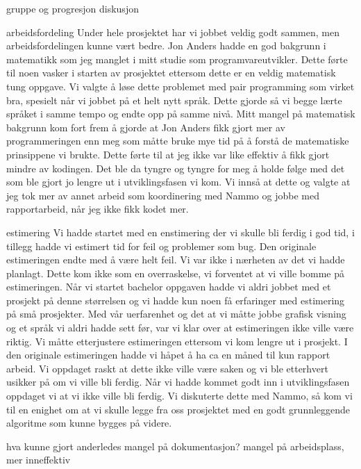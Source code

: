 gruppe og progresjon diskusjon
	
arbeidsfordeling
Under hele prosjektet har vi jobbet veldig godt sammen, men arbeidsfordelingen kunne vært bedre. Jon Anders hadde en god bakgrunn i matematikk som jeg manglet i mitt studie som programvareutvikler. Dette førte til noen vasker i starten av prosjektet ettersom dette er en veldig matematisk tung oppgave. Vi valgte å løse dette problemet med pair programming som virket bra, spesielt når vi jobbet på et helt nytt språk. Dette gjorde så vi begge lærte språket i samme tempo og endte opp på samme nivå. Mitt mangel på matematisk bakgrunn kom fort frem å gjorde at Jon Anders fikk gjort mer av programmeringen enn meg som måtte bruke mye tid på å forstå de matematiske prinsippene vi brukte. Dette førte til at jeg ikke var like effektiv å fikk gjort mindre av kodingen. Det ble da tyngre og tyngre for meg å holde følge med det som ble gjort jo lengre ut i utviklingsfasen vi kom. Vi innså at dette og valgte at jeg tok mer av annet arbeid som koordinering med Nammo og jobbe med rapportarbeid, når jeg ikke fikk kodet mer.



	estimering
Vi hadde startet med en enstimering der vi skulle bli ferdig i god tid, i tillegg hadde vi estimert tid for feil og problemer som bug. Den originale estimeringen endte med å være helt feil. Vi var ikke i nærheten av det vi hadde planlagt. Dette kom ikke som en overraskelse, vi forventet at vi ville bomme på estimeringen. Når vi startet bachelor oppgaven hadde vi aldri jobbet med et prosjekt på denne størrelsen og vi hadde kun noen få erfaringer med estimering på små prosjekter. Med vår uerfarenhet og det at vi måtte jobbe grafisk visning og et språk vi aldri hadde sett før, var vi klar over at estimeringen ikke ville være riktig. Vi måtte etterjustere estimeringen ettersom vi kom lengre ut i prosjekt. I den originale estimeringen hadde vi håpet å ha ca en måned til kun rapport arbeid. Vi oppdaget raskt at dette ikke ville være saken og vi ble etterhvert usikker på om vi ville bli ferdig. Når vi hadde kommet godt inn i utviklingsfasen oppdaget vi at vi ikke ville bli ferdig. Vi diskuterte dette med Nammo, så kom vi til en enighet om at vi skulle legge fra oss prosjektet med en godt grunnleggende algoritme som kunne bygges på videre.

hva kunne gjort anderledes
mangel på dokumentasjon?
mangel på arbeidsplass, mer inneffektiv


